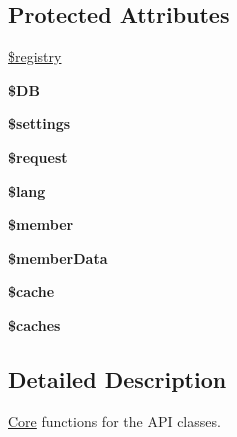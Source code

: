 \subsection*{Protected Attributes}
\begin{DoxyCompactItemize}
\item 
\hyperlink{classapi_core_a531e4a386aaa7f3e06d3642dc38d7e80}{\$registry}
\item 
\hypertarget{classapi_core_a7dc56dc8b18ad37272b56fa7395bedef}{{\bfseries \$\-D\-B}}\label{classapi_core_a7dc56dc8b18ad37272b56fa7395bedef}

\item 
\hypertarget{classapi_core_ac7c3353107070daa85f641882931b358}{{\bfseries \$settings}}\label{classapi_core_ac7c3353107070daa85f641882931b358}

\item 
\hypertarget{classapi_core_abb35c8495a232b510389fa6d7b15d38a}{{\bfseries \$request}}\label{classapi_core_abb35c8495a232b510389fa6d7b15d38a}

\item 
\hypertarget{classapi_core_a7714b111b644017933931ec69a154102}{{\bfseries \$lang}}\label{classapi_core_a7714b111b644017933931ec69a154102}

\item 
\hypertarget{classapi_core_a5e1c849c6148a8732eee400fcee0d044}{{\bfseries \$member}}\label{classapi_core_a5e1c849c6148a8732eee400fcee0d044}

\item 
\hypertarget{classapi_core_ae9d848ba2cf6eee63bdc060e2dfcf95a}{{\bfseries \$member\-Data}}\label{classapi_core_ae9d848ba2cf6eee63bdc060e2dfcf95a}

\item 
\hypertarget{classapi_core_ac2dc76d756ec398393d4b1d23659276c}{{\bfseries \$cache}}\label{classapi_core_ac2dc76d756ec398393d4b1d23659276c}

\item 
\hypertarget{classapi_core_a0334a912b7c2d39a9bc71177578d782e}{{\bfseries \$caches}}\label{classapi_core_a0334a912b7c2d39a9bc71177578d782e}

\end{DoxyCompactItemize}


\subsection{Detailed Description}
\hyperlink{namespace_core}{Core} functions for the A\-P\-I classes. 

